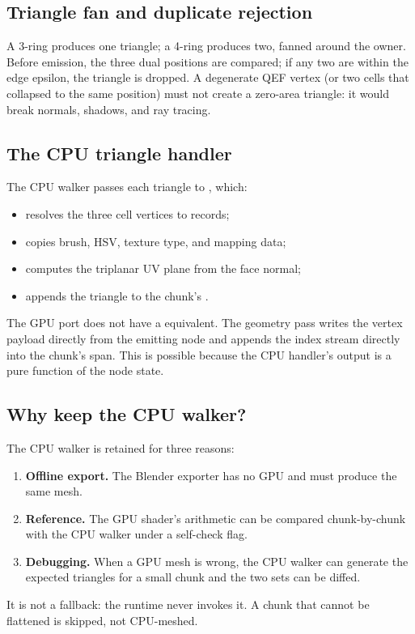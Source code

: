 \subsection{Triangle fan and duplicate rejection}

A 3-ring produces one triangle; a 4-ring produces two, fanned around the
owner.  Before emission, the three dual positions are compared; if any two
are within the edge epsilon, the triangle is dropped.  A degenerate QEF
vertex (or two cells that collapsed to the same position) must not create a
zero-area triangle: it would break normals, shadows, and ray tracing.

\subsection{The CPU triangle handler}

The CPU walker passes each triangle to , which:
\begin{itemize}
\item resolves the three cell vertices to  records;
\item copies brush, HSV, texture type, and mapping data;
\item computes the triplanar UV plane from the face normal;
\item appends the triangle to the chunk's .
\end{itemize}
The GPU port does not have a  equivalent.  The geometry
pass writes the vertex payload directly from the emitting node and appends
the index stream directly into the chunk's span.  This is possible because
the CPU handler's output is a pure function of the node state.

\subsection{Why keep the CPU walker?}

The CPU walker is retained for three reasons:
\begin{enumerate}
\item \textbf{Offline export.}  The Blender exporter has no GPU and must
  produce the same mesh.
\item \textbf{Reference.}  The GPU shader's arithmetic can be compared
  chunk-by-chunk with the CPU walker under a self-check flag.
\item \textbf{Debugging.}  When a GPU mesh is wrong, the CPU walker can
  generate the expected triangles for a small chunk and the two sets can be
  diffed.
\end{enumerate}
It is not a fallback: the runtime never invokes it.  A chunk that cannot be
flattened is skipped, not CPU-meshed.
